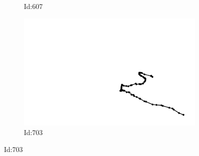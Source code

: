 \documentclass[12pt,twoside]{report}
\begin{document}
\begin{figure}
\begin{subfigure}[b]{0.20\textwidth}
\caption{Id:607}
\end{subfigure}
\begin{subfigure}[b]{0.20\textwidth}
\centering
\includegraphics[width=\textwidth]{../../trajectories/703.png}
\caption{Id:703}
\end{subfigure}
\end{figure}
\end{document}
